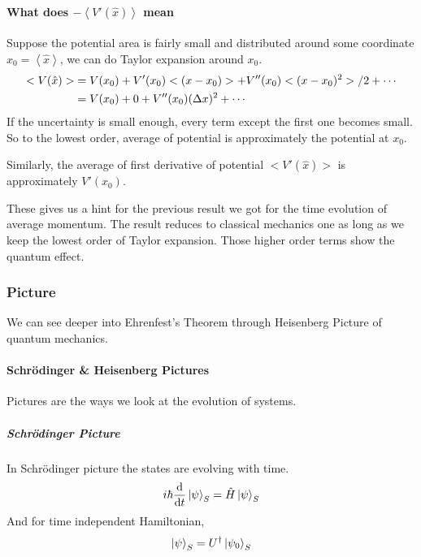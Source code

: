 \documentclass[letterpaper,10pt,english]{sphinxmanual}
\def\d{{\rm d}}
\newcommand{\ket}[1]{\left| #1\right\rangle}
\begin{document}
\paragraph{What does \(-\left< V'(\hat x)\right>\) mean}
\label{Quantum/QuantumMechanics:what-does-mean}
Suppose the potential area is fairly small and distributed around some coordinate \(x_0=\left< \hat x \right>\), we can do Taylor expansion around \(x_0\).
\begin{gather}
\begin{split}< V(\hat x)> & =  V(x_0)   +  V'(x_0) < (x - x_0)> + V''(x_0)<(x-x_0)^2> /2 + \cdots \\
& =  V(x_0) + 0 + V''(x_0) (\Delta x)^2 + \cdots\end{split}\notag
\end{gather}
If the uncertainty is small enough, every term except the first one becomes small. So to the lowest order, average of potential is approximately the potential at \(x_0\).

Similarly, the average of first derivative of potential \(<V'(\hat x)>\) is approximately \(V'(x_0)\).

These gives us a hint for the previous result we got for the time evolution of average momentum. The result reduces to classical mechanics one as long as we keep the lowest order of Taylor expansion. Those higher order terms show the quantum effect.


\subsubsection{Picture}
\label{Quantum/QuantumMechanics:picture}
We can see deeper into Ehrenfest's Theorem through Heisenberg Picture of quantum mechanics.


\paragraph{Schrödinger \& Heisenberg Pictures}
\label{Quantum/QuantumMechanics:schrodinger-heisenberg-pictures}
Pictures are the ways we look at the evolution of systems.


\subparagraph{Schrödinger Picture}
\label{Quantum/QuantumMechanics:schrodinger-picture}
In Schrödinger picture the states are evolving with time.
\begin{gather}
\begin{split}i\hbar \frac{\d}{\d t} \ket{\psi} _ S = \hat H \ket{\psi} _ S\end{split}\notag
\end{gather}
And for time independent Hamiltonian,
\begin{gather}
\begin{split}\ket{\psi}_S = U^\dagger \ket{\psi _ 0} _ S\end{split}\notag
\end{gather}
\end{document}
